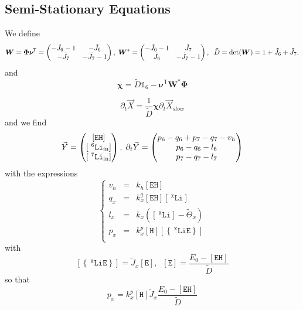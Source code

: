 \documentclass[aps,onecolumn,10pt]{revtex4}
\newcommand{\mychem}[1]{\mathtt{#1}}
\newcommand{\myconc}[1]{\left\lbrack{#1}\right\rbrack}
\newcommand{\spLi}[1]{{~^{\mychem{#1}}\mychem{Li}}}
\newcommand{\Li}[1]{\myconc{\spLi{#1}}}
\newcommand{\spEout}{\mychem{E}}
\newcommand{\Eout}{\myconc{\spEout}}
\newcommand{\spLiE}[1]{\left\lbrace\spLi{#1}\spEout\right\rbrace}
\newcommand{\LiE}[1]{\myconc{\spLiE{#1}}}
\newcommand{\spLiIn}[1]{{\spLi{#1}}_{\mathrm{in}}}
\newcommand{\LiIn}[1]{\myconc{\spLiIn{#1}}}
\newcommand{\spEHin}{\mychem{EH}}
\newcommand{\EHin}{\myconc{\spEHin}}
\newcommand{\spproton}{\mychem{H}}
\newcommand{\proton}{\myconc{\spproton}}
\newcommand{\mytrn}[1]{{#1}^{\!\mathsf{T}}}
\newcommand{\mymat}[1]{{\bm{#1}}}
\begin{document}
\subsection{Semi-Stationary Equations}
We define
\begin{equation}
	\mymat{W} = \mymat{\Phi}\mytrn{\mymat{\nu}} = \begin{pmatrix} -\tilde{J}_6-1 & -\tilde{J}_6 \cr -\tilde{J}_7 & -\tilde{J}_7-1\end{pmatrix}
	,\;\mymat{W}^\ast = \begin{pmatrix} -\tilde{J}_6-1 & \tilde{J}_7 \cr \tilde{J}_6 & -\tilde{J}_7-1\end{pmatrix}
	,\;\; \tilde{D} =\det(\mymat{W})=1+\tilde{J}_6+\tilde{J}_7.
\end{equation}
and
\begin{equation}
	\mymat{\chi} = \tilde{D}\mathds{1}_6-\mytrn{\mymat{\nu}}\mymat{W}^\ast\mymat{\Phi}
\end{equation}

\begin{equation}
	\partial_t\vec{X} = \dfrac{1}{\tilde{D}}
	\mymat{\chi} \partial_t\vec{X}_{slow}
\end{equation}
and we find
\begin{equation}
	\vec{Y} = \begin{pmatrix} \EHin \cr \LiIn{6} \cr \LiIn{7} \end{pmatrix}
	,\;\partial_t \vec{Y} = 
	\begin{pmatrix}
	p_6-q_6+p_7-q_7-v_h\\
	p_6-q_6-l_6\\
	p_7-q_7-l_7
	\end{pmatrix}
\end{equation}
with the expressions
\begin{equation}
\left\lbrace
	\begin{array}{rcl}
	v_h & = & k_h \EHin \\
	q_x & = & k_x^q \EHin \Li{x}  \\
	l_x & = & k_x  \left(\Li{x}- \tilde{\Theta}_x\right)\\
	p_x & = & k_x^p \proton \LiE{x}\\
	\end{array}
\right.
\end{equation}
with
\begin{equation}
	\LiE{x} = \tilde{J}_x \Eout,\;\;\Eout=\dfrac{E_0-\EHin}{\tilde{D}}
\end{equation}
so that
\begin{equation}
	p_x = k_x^p \proton  \tilde{J}_x \dfrac{E_0-\EHin}{\tilde{D}}
\end{equation}
\end{document}
